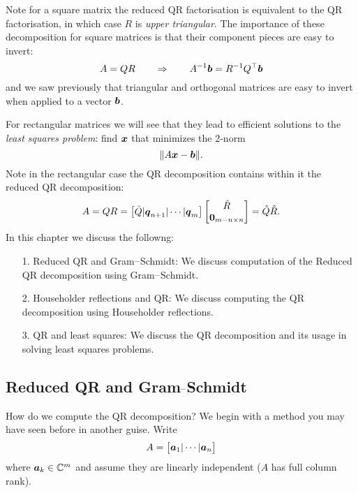 Note for a square matrix the reduced QR factorisation is equivalent to the QR factorisation, in which case $R$ is \emph{upper triangular}. The importance of these decomposition for square matrices is that their component pieces are easy to invert:
\[
A = QR \qquad \Rightarrow \qquad A^{-1}\bm{{\mbox{\boldmath$b$\unboldmath}}} = R^{-1} Q^\top \bm{{\mbox{\boldmath$b$\unboldmath}}}
\]
and we saw previously that triangular and orthogonal matrices are easy to invert when applied to a vector $\bm{{\mbox{\boldmath$b$\unboldmath}}}$.

For rectangular matrices we will see that they lead to efficient solutions to the \emph{least squares problem}: find $\bm{{\mbox{\boldmath$x$\unboldmath}}}$ that minimizes the 2-norm
\[
\| A \bm{{\mbox{\boldmath$x$\unboldmath}}} - \bm{{\mbox{\boldmath$b$\unboldmath}}} \|.
\]
Note in the rectangular case the QR decomposition contains within it the reduced QR decomposition:
\[
A = QR = \begin{bmatrix} \hat Q | \bm{{\mbox{\boldmath$q$\unboldmath}}}_{n+1} | \cdots | \bm{{\mbox{\boldmath$q$\unboldmath}}}_m \end{bmatrix} \begin{bmatrix} \hat R \\  \bm{{\mbox{\boldmath$0$\unboldmath}}}_{m-n \times n} \end{bmatrix} = \hat Q \hat R.
\]
In this chapter we discuss the followng:

\begin{itemize}
\item[1. ] Reduced QR and Gram\ensuremath{\endash}Schmidt: We discuss computation of the Reduced QR decomposition using Gram\ensuremath{\endash}Schmidt.


\item[2. ] Householder reflections and QR: We discuss computing the  QR decomposition using Householder reflections.


\item[3. ] QR and least squares: We discuss the QR decomposition and its usage in solving least squares problems.

\end{itemize}
\subsection{Reduced QR and Gram\ensuremath{\endash}Schmidt}
How do we compute the QR decomposition? We begin with a method you may have seen before in another guise. Write
\[
A = \begin{bmatrix} \bm{{\mbox{\boldmath$a$\unboldmath}}}_1 | \cdots | \bm{{\mbox{\boldmath$a$\unboldmath}}}_n \end{bmatrix}
\]
where $\bm{{\mbox{\boldmath$a$\unboldmath}}}_k \in  {\mathbb C}^m$ and assume they are linearly independent ($A$ has full column rank).

